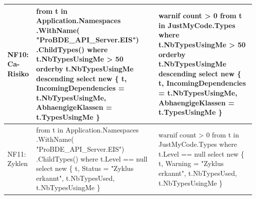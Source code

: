 \begin{longtable}{|>{\raggedright\arraybackslash}p{}|>{\raggedright\arraybackslash}p{}|>{\raggedright\arraybackslash}p{}|}
NF10: Ca-Risiko &
{\ttfamily
from t in Application.Namespaces\newline
\quad .WithName(\newline
\quad \quad "ProBDE\_API\_Server.EIS")\newline
\quad .ChildTypes()\newline
where t.NbTypesUsingMe > 50\newline
orderby t.NbTypesUsingMe descending\newline
select new \{ t, \newline
\quad IncomingDependencies = \newline
\quad \quad t.NbTypesUsingMe, \newline
\quad AbhaengigeKlassen = \newline
\quad \quad t.TypesUsingMe \}
}
&
{\ttfamily
warnif count > 0\newline
from t in JustMyCode.Types\newline
where t.NbTypesUsingMe > 50\newline
orderby t.NbTypesUsingMe descending\newline
select new \{ t, \newline
\quad IncomingDependencies = \newline
\quad \quad t.NbTypesUsingMe, \newline
\quad AbhaengigeKlassen = \newline
\quad \quad t.TypesUsingMe \}
}
\\ \hline

NF11: Zyklen &
{\ttfamily
from t in Application.Namespaces\newline
\quad .WithName(\newline
\quad \quad "ProBDE\_API\_Server.EIS")\newline
\quad .ChildTypes()\newline
where t.Level == null\newline
select new \{ t, \newline
\quad Status = "Zyklus erkannt", \newline
\quad t.NbTypesUsed, \newline
\quad t.NbTypesUsingMe \}
}
&
{\ttfamily
warnif count > 0\newline
from t in JustMyCode.Types\newline
where t.Level == null\newline
select new \{ t, \newline
\quad Warning = "Zyklus erkannt", \newline
\quad t.NbTypesUsed, \newline
\quad t.NbTypesUsingMe \}
}
\\ \hline


\end{longtable}
